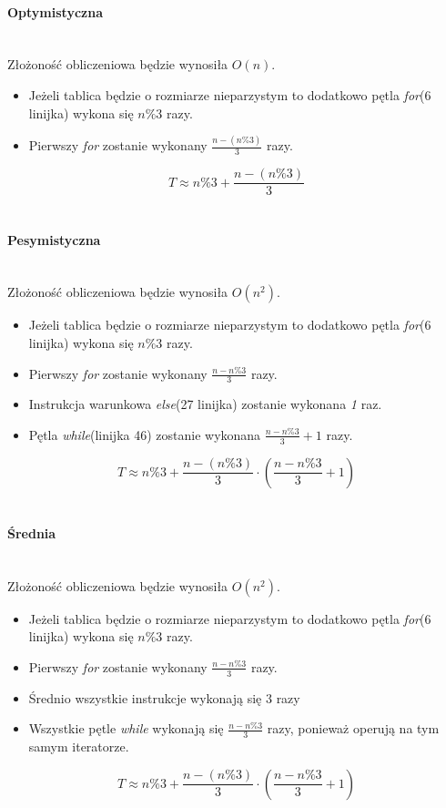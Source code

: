 \paragraph{Optymistyczna}\mbox{}\\

Złożoność obliczeniowa będzie wynosiła $O(n)$.

\begin{itemize}
\item Jeżeli tablica będzie o rozmiarze nieparzystym to dodatkowo pętla \textit{for}(6 linijka) wykona się $n\%3$ razy.
\item Pierwszy \textit{for} zostanie wykonany $\frac{n-(n\%3)}{3} $ razy.
\end{itemize}
\begin{equation*}
T \approx n\%3+\frac{n-(n\%3)}{3}
\end{equation*}
\wyjT\\
\paragraph{Pesymistyczna}\mbox{}\\
Złożoność obliczeniowa będzie wynosiła $O(n^2)$.

\begin{itemize}

\item Jeżeli tablica będzie o rozmiarze nieparzystym to dodatkowo pętla \textit{for}(6 linijka) wykona się $n\%3$ razy.
\item Pierwszy \textit{for} zostanie wykonany $\frac{n-n\%3}{3}$ razy.
\item Instrukcja warunkowa \textit{else}(27 linijka) zostanie wykonana \textit{1} raz.
\item Pętla \textit{while}(linijka 46) zostanie wykonana $\frac{n-n\%3}{3} +1$  razy.
\end{itemize}
\begin{equation*}
T \approx n\%3 + \frac{n-(n\%3)}{3} \cdot(\frac{n-n\%3}{3} +1)
\end{equation*}
\wyjT\\


\paragraph{Średnia}\mbox{}\\
Złożoność obliczeniowa będzie wynosiła $O(n^2)$.
\begin{itemize}

\item Jeżeli tablica będzie o rozmiarze nieparzystym to dodatkowo pętla \textit{for}(6 linijka) wykona się $n\%3$ razy.
\item Pierwszy \textit{for} zostanie wykonany $\frac{n-n\%3}{3}$ razy.
\item Średnio wszystkie instrukcje wykonają się $3$ razy
\item Wszystkie pętle \textit{while} wykonają się $\frac{n-n\%3}{3}$ razy, ponieważ operują na tym samym iteratorze.
\end{itemize}
\begin{equation*}
T \approx n\%3 + \frac{n-(n\%3)}{3} \cdot(\frac{n-n\%3}{3} +1)
\end{equation*}
\wyjT\\
